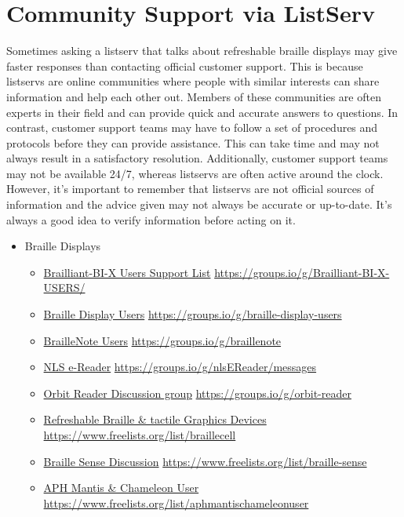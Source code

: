 \documentclass[14pt,letterpaper,twoside]{extreport}
\begin{document}
\begin{appendices}
\hypertarget{listserv2}{}\section{Community Support via ListServ}\label{listserv2}
Sometimes asking a listserv that talks about refreshable braille displays may give faster responses than contacting official customer support. This is because listservs are online communities where people with similar interests can share information and help each other out. Members of these communities are often experts in their field and can provide quick and accurate answers to questions. In contrast, customer support teams may have to follow a set of procedures and protocols before they can provide assistance. This can take time and may not always result in a satisfactory resolution. Additionally, customer support teams may not be available 24/7, whereas listservs are often active around the clock. However, it’s important to remember that listservs are not official sources of information and the advice given may not always be accurate or up-to-date. It’s always a good idea to verify information before acting on it.
\begin{itemize}[leftmargin=*]
\item Braille Displays
\begin{itemize}[leftmargin=2em]
\item \href{https://groups.io/g/Brailliant-BI-X-USERS/}{Brailliant-BI-X Users Support List}  \break\url{https://groups.io/g/Brailliant-BI-X-USERS/} 
\item \href{https://groups.io/g/braille-display-users}{Braille Display Users}  \break\url{https://groups.io/g/braille-display-users}
\item \href{https://groups.io/g/braillenote}{BrailleNote Users}  \break\url{https://groups.io/g/braillenote}
\item \href{https://groups.io/g/nlsEReader/messages}{NLS e-Reader}  \break\url{https://groups.io/g/nlsEReader/messages}
\item \href{https://groups.io/g/orbit-reader}{Orbit Reader Discussion group}  \break\url{https://groups.io/g/orbit-reader}
\item \href{https://www.freelists.org/list/braillecell}{Refreshable Braille \& tactile Graphics Devices}  \break\url{https://www.freelists.org/list/braillecell}
\item \href{https://www.freelists.org/list/braille-sense}{Braille Sense Discussion}  \break\url{https://www.freelists.org/list/braille-sense}
\item \href{https://www.freelists.org/list/aphmantischameleonuser}{APH Mantis \& Chameleon User}  \break\url{https://www.freelists.org/list/aphmantischameleonuser}

\end{itemize}
\end{itemize}
\end{appendices}
\end{document}
